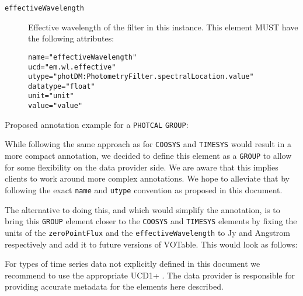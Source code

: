 \documentclass[11pt,a4paper]{ivoa}
\let\fg=\color
\def\attr#1{{\tt{\fg{DarkRed}#1}}}
\def\elem#1{{\tt{\fg{DarkRed}#1}}}
\def\attrval#1#2{{\tt{\fg{DarkRed}#1}="{\fg{DarkPurple}#2}"}}
\begin{document}
\begin{description}
\item[\elem{effectiveWavelength}] Effective wavelength of the filter in this instance. This element MUST have the following attributes:
\begin{description}
    \item[\attrval{name}{effectiveWavelength}]
    \item[\attrval{ucd}{em.wl.effective}]
    \item[\attrval{utype}{photDM:PhotometryFilter.spectralLocation.value}] 
    \item[\attrval{datatype}{float}]
    \item[\attrval{unit}{unit}]
    \item[\attrval{value}{value}]
\end{description}
\end{description}

Proposed annotation example for a \texttt{PHOTCAL} \elem{GROUP}: 



While following the same approach as for \elem{COOSYS} and \elem{TIMESYS} would result in a more compact annotation, we decided to define this element as a \elem{GROUP} to allow for some flexibility on the data provider side. We are aware that this implies clients to work around more complex annotations. We hope to alleviate that by following the exact \attr{name} and \attr{utype} convention as proposed in this document.

The alternative to doing this, and which would simplify the annotation, is to bring this \elem{GROUP} element closer to the \elem{COOSYS} and \elem{TIMESYS} elements by fixing the units of the \attr{zeroPointFlux} and the \attr{effectiveWavelength} to Jy and Angstrom respectively and add it to future versions of VOTable. This would look as follows: 




%

For types of time series data not explicitly defined in this document we recommend to use the appropriate UCD1+ \citep{2005ivoa.spec.0819D}. The data provider is responsible for providing accurate metadata for the elements here described.


%
\end{document}
